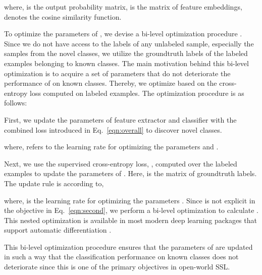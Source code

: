 \documentclass[runningheads]{eccv2022submission}
\begin{document}
\vspace{-2mm}

where,  is the output probability matrix,  is the matrix of feature embeddings,  denotes the cosine similarity function.



To optimize the parameters of , we devise a bi-level optimization procedure \cite{bard2013practical}. Since we do not have access to the labels of any unlabeled sample, especially the samples from the novel classes, we utilize the groundtruth labels of the labeled examples belonging to known classes. The main motivation behind this bi-level optimization is to acquire a set of parameters  that do not deteriorate the performance of  on known classes. Thereby, we optimize  based on the cross-entropy loss computed on labeled examples. The optimization procedure is as follows:


First, we update the parameters of feature extractor and classifier with the combined loss introduced in Eq.~\ref{eqn:overall} to discover novel classes.
\setlength{\abovedisplayskip}{4pt}
\setlength{\belowdisplayskip}{2pt}
\setlength{\abovedisplayshortskip}{0pt}
\setlength{\belowdisplayshortskip}{0pt}

where,  refers to the learning rate for optimizing the parameters  and . 

Next, we use the supervised cross-entropy loss, , computed over the labeled examples to update the parameters of . Here,  is the matrix of groundtruth labels. The update rule is according to,
\setlength{\abovedisplayskip}{4pt}
\setlength{\belowdisplayskip}{2pt}
\setlength{\abovedisplayshortskip}{0pt}
\setlength{\belowdisplayshortskip}{0pt}

where,  is the learning rate for optimizing the parameters . Since  is not explicit in the objective  in Eq.~\ref{eqn:second}, we perform a bi-level optimization to calculate . This nested optimization is available in most modern deep learning packages that support automatic differentiation \cite{paszke2017automatic,tensorflow2015}.


This bi-level optimization procedure ensures that the parameters of  are updated in such a way that the classification performance on known classes does not deteriorate since this is one of the primary objectives in open-world SSL. 

\vspace{-4mm}
\end{document}
